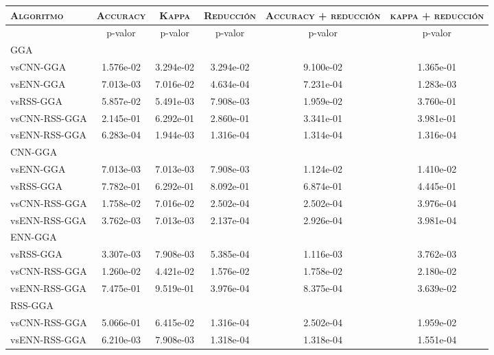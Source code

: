 \begin{table}[h!]
\centering
\begin{adjustbox}{max width =\textwidth}
\begin{tabular}{l c c c c c}
\hline
	\textsc{Algoritmo}
	& \multicolumn{1}{c}{\textsc{Accuracy}}
	& \multicolumn{1}{c}{\textsc{Kappa}}
	& \multicolumn{1}{c}{\textsc{Reducción}} 
	& \multicolumn{1}{c}{\textsc{Accuracy + reducción}} 
	& \multicolumn{1}{c}{\textsc{kappa + reducción}} \\
\hline
\hline

 & p-valor & p-valor & p-valor & p-valor & p-valor \\

GGA\\
vsCNN-GGA   & 1.576e-02 & 3.294e-02 & 3.294e-02 & 9.100e-02 & 1.365e-01 \\   
vsENN-GGA   & 7.013e-03 & 7.016e-02 & 4.634e-04 & 7.231e-04 & 1.283e-03 \\  
vsRSS-GGA    & 5.857e-02 & 5.491e-03 & 7.908e-03 & 1.959e-02 & 3.760e-01 \\ 
vsCNN-RSS-GGA & 2.145e-01 & 6.292e-01 & 2.860e-01 & 3.341e-01 & 3.981e-01 \\
vsENN-RSS-GGA & 6.283e-04 & 1.944e-03 & 1.316e-04 & 1.314e-04 & 1.316e-04 \\

\hline

CNN-GGA\\
vsENN-GGA & 7.013e-03 & 7.013e-03 & 7.908e-03 & 1.124e-02 & 1.410e-02 \\
vsRSS-GGA & 7.782e-01 & 6.292e-01 & 8.092e-01 & 6.874e-01 & 4.445e-01 \\
vsCNN-RSS-GGA & 1.758e-02 & 7.016e-02 & 2.502e-04 & 2.502e-04 & 3.976e-04 \\
vsENN-RSS-GGA & 3.762e-03 & 7.013e-03 & 2.137e-04 & 2.926e-04 & 3.981e-04 \\ 

\hline

ENN-GGA\\
vsRSS-GGA & 3.307e-03 & 7.908e-03 & 5.385e-04 & 1.116e-03 & 3.762e-03 \\ 
vsCNN-RSS-GGA & 1.260e-02 & 4.421e-02 & 1.576e-02 & 1.758e-02 & 2.180e-02 \\
vsENN-RSS-GGA & 7.475e-01 & 9.519e-01 & 3.976e-04 & 8.375e-04 & 3.639e-02 \\

\hline

RSS-GGA\\
vsCNN-RSS-GGA & 5.066e-01 & 6.415e-02 & 1.316e-04 & 2.502e-04 & 1.959e-02 \\
vsENN-RSS-GGA  & 6.210e-03 & 7.908e-03 & 1.318e-04 & 1.318e-04 & 1.551e-04 \\ 


\end{tabular}
\end{adjustbox}
\end{table}
